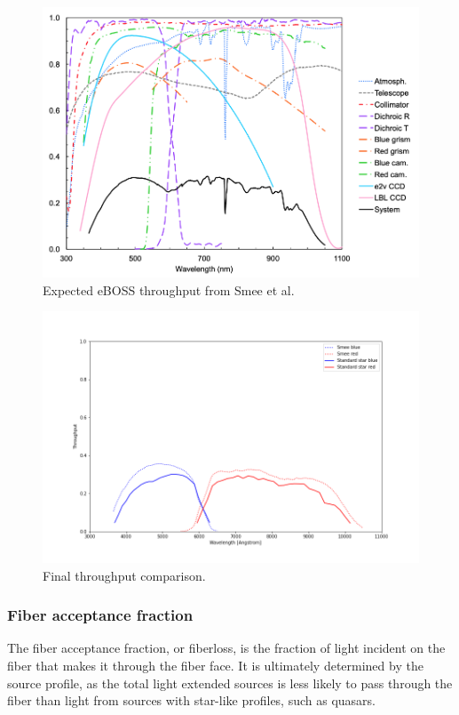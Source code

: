\begin{figure}[h]
\centering
\includegraphics[width=14cm]{images/specsim/smee_throughput.png}
\caption{Expected eBOSS throughput from Smee et al.}
\label{fig:smee}
\end{figure}

\begin{figure}[h]
\centering
\includegraphics[width=14cm]{images/specsim/throughput_7027_56448.png}
\caption{Final throughput comparison.}
\label{fig:throughput}
\end{figure}


\subsubsection{Fiber acceptance fraction}

The fiber acceptance fraction, or fiberloss, is the fraction of light incident on the fiber that makes it through the fiber face. It is ultimately determined by the source profile, as the total light extended sources is less likely to pass through the fiber than light from sources with star-like profiles, such as quasars.

